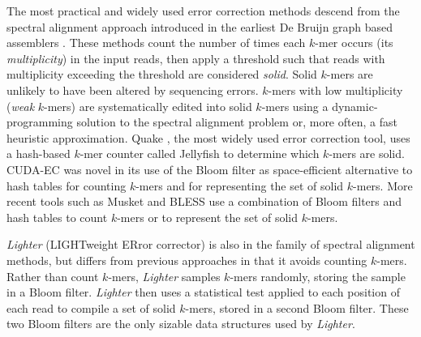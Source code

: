 \documentclass[10pt]{article}
\begin{document}

The most practical and widely used error correction methods descend from the spectral alignment approach introduced in the earliest De Bruijn graph based assemblers \cite{pevzner2001eulerian, chaisson2004fragment}.
These methods count the number of times each $k$-mer occurs (its \emph{multiplicity}) in the input reads, then apply a threshold such that reads with multiplicity exceeding the threshold are considered \emph{solid}.
Solid $k$-mers are unlikely to have been altered by sequencing errors.
$k$-mers with low multiplicity (\emph{weak} $k$-mers) are systematically edited into solid $k$-mers using a dynamic-programming solution to the spectral alignment problem \cite{pevzner2001eulerian, chaisson2004fragment} or, more often, a fast heuristic approximation.
Quake \cite{kelley2010quake}, the most widely used error correction tool, uses a hash-based $k$-mer counter called Jellyfish \cite{marccais2011fast} to determine which $k$-mers are solid.
CUDA-EC \cite{shi2010parallel} was novel in its use of the Bloom filter as space-efficient alternative to hash tables for counting $k$-mers and for representing the set of solid $k$-mers.
More recent tools such as Musket \cite{liu2013musket} and BLESS \cite{heo2014bless} use a combination of Bloom filters and hash tables to count $k$-mers or to represent the set of solid $k$-mers.

\emph{Lighter} (LIGHTweight ERror corrector) is also in the family of spectral alignment methods, but differs from previous approaches in that it avoids counting $k$-mers.
Rather than count $k$-mers, \emph{Lighter} samples $k$-mers randomly, storing the sample in a Bloom filter.
\emph{Lighter} then uses a statistical test applied to each position of each read to compile a set of solid $k$-mers, stored in a second Bloom filter.
These two Bloom filters are the only sizable data structures used by \emph{Lighter}.
\end{document}
